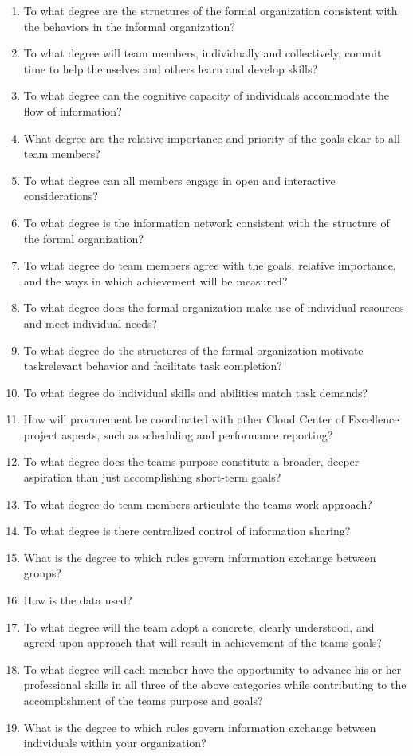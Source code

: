 \documentclass[10pt,letterpaper]{article}
\begin{document}
\begingroup\small\begin{enumerate}[leftmargin=2.1em, itemsep=4pt]
\item[1.] To what degree are the structures of the formal organization consistent with the behaviors in the informal organization?
\item[2.] To what degree will team members, individually and collectively, commit time to help themselves and others learn and develop skills?
\item[3.] To what degree can the cognitive capacity of individuals accommodate the flow of information?
\item[4.] What degree are the relative importance and priority of the goals clear to all team members?
\item[5.] To what degree can all members engage in open and interactive considerations?
\item[6.] To what degree is the information network consistent with the structure of the formal organization?
\item[7.] To what degree do team members agree with the goals, relative importance, and the ways in which achievement will be measured?
\item[8.] To what degree does the formal organization make use of individual resources and meet individual needs?
\item[9.] To what degree do the structures of the formal organization motivate taskrelevant behavior and facilitate task completion?
\item[10.] To what degree do individual skills and abilities match task demands?
\item[11.] How will procurement be coordinated with other Cloud Center of Excellence project aspects, such as scheduling and performance reporting?
\item[12.] To what degree does the teams purpose constitute a broader, deeper aspiration than just accomplishing short-term goals?
\item[13.] To what degree do team members articulate the teams work approach?
\item[14.] To what degree is there centralized control of information sharing?
\item[15.] What is the degree to which rules govern information exchange between groups?
\item[16.] How is the data used?
\item[17.] To what degree will the team adopt a concrete, clearly understood, and agreed-upon approach that will result in achievement of the teams goals?
\item[18.] To what degree will each member have the opportunity to advance his or her professional skills in all three of the above categories while contributing to the accomplishment of the teams purpose and goals?
\item[19.] What is the degree to which rules govern information exchange between individuals within your organization?
\end{enumerate}\endgroup
\end{document}
